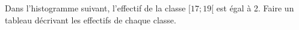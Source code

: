 
\begin{exercice}\label{exoSeconde-0035}

Dans l'histogramme suivant, l'effectif de la classe $[17;19[$ est égal à 2. Faire un tableau décrivant les effectifs de chaque classe. 
\begin{center}
   
\end{center}

\end{exercice}
